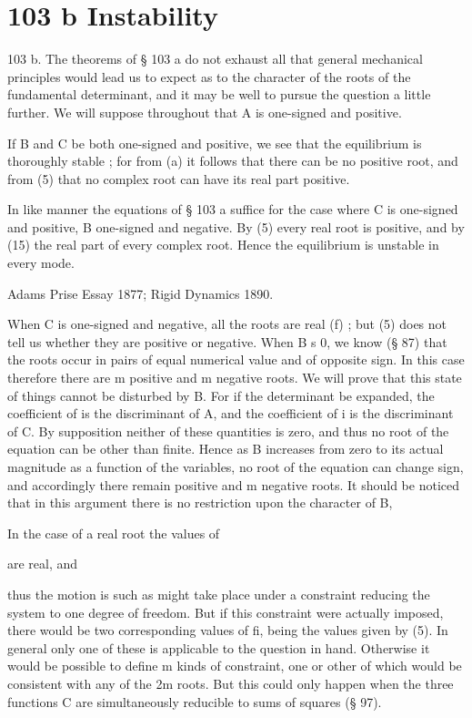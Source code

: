\section{103 b Instability}\label{sect:103b}
103 b. The theorems of § 103 a do not exhaust all that general
mechanical principles would lead us to expect as to the character
of the roots of the fundamental determinant, and it may be well
to pursue the question a little further. We will suppose throughout that A is
one-signed and positive.

If B and C be both one-signed and positive, we see that the
equilibrium is thoroughly stable ; for from (a) it follows that there
can be no positive root, and from (5) that no complex root can have
its real part positive.

In like manner the equations of § 103 a suffice for the case
where C is one-signed and positive, B one-signed and negative.
By (5) every real root is positive, and by (15) the real part
of every complex root. Hence the equilibrium is unstable in
every mode.

 Adams Prise Essay 1877; Rigid Dynamics 1890.

When C is one-signed and negative, all the roots are real (f) ;
but (5) does not tell us whether they are positive or negative.
When B s 0, we know (§ 87) that the roots occur in pairs of equal
numerical value and of opposite sign. In this case therefore
there are m positive and m negative roots. We will prove that
this state of things cannot be disturbed by B. For if the determinant be
expanded, the coefficient of is the discriminant of A,
and the coefficient of i is the discriminant of C. By supposition
neither of these quantities is zero, and thus no root of the equation
can be other than finite. Hence as B increases from zero to its
actual magnitude as a function of the variables, no root of the
equation can change sign, and accordingly there remain
positive and m negative roots. It should be noticed that in this
argument there is no restriction upon the character of B,

In the case of a real root the values of

are real, and

thus the motion is such as might take place under a constraint
reducing the system to one degree of freedom. But if this constraint were
actually imposed, there would be two corresponding
values of fi, being the values given by (5). In general only one of
these is applicable to the question in hand. Otherwise it would
be possible to define m kinds of constraint, one or other of which
would be consistent with any of the 2m roots. But this could
only happen when the three functions C are simultaneously
reducible to sums of squares (§ 97).

